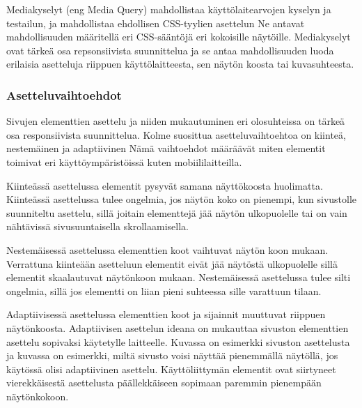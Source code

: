 \documentclass[11pt,a4paper,titlepage,oneside]{article}
\begin{document}
Mediakyselyt (eng Media Query) mahdollistaa käyttölaitearvojen kyselyn ja testailun,
ja mahdollistaa ehdollisen CSS-tyylien asettelun
Ne antavat mahdollisuuden määritellä eri CSS-sääntöjä eri kokoisille näytöille. 
Mediakyselyt ovat tärkeä osa repsonsiivista suunnittelua ja se antaa mahdollisuuden luoda erilaisia asetteluja riippuen käyttölaitteesta,
sen näytön koosta tai kuvasuhteesta.












\subsubsection{Asetteluvaihtoehdot}





Sivujen elementtien asettelu ja niiden mukautuminen eri olosuhteissa on tärkeä osa responsiivista suunnittelua.
Kolme suosittua asetteluvaihtoehtoa on kiinteä, nestemäinen ja adaptiivinen
Nämä vaihtoehdot määräävät miten elementit toimivat eri käyttöympäristöissä kuten mobiililaitteilla.
\medskip



Kiinteässä asettelussa elementit pysyvät samana näyttökoosta huolimatta. 
Kiinteässä asettelussa tulee ongelmia, jos näytön koko on pienempi, kun sivustolle suunniteltu asettelu, 
sillä joitain elementtejä jää näytön ulkopuolelle tai on vain nähtävissä sivusuuntaisella skrollaamisella.
\medskip


Nestemäisessä asettelussa elementtien koot vaihtuvat näytön koon mukaan. 
Verrattuna kiinteään asetteluun elementit eivät jää näytöstä ulkopuolelle sillä elementit skaalautuvat näytönkoon mukaan.
Nestemäisessä asettelussa tulee silti ongelmia, sillä jos elementti on liian pieni suhteessa sille varattuun tilaan.
\medskip


Adaptiivisessä asettelussa elementtien koot ja sijainnit muuttuvat riippuen näytönkoosta.
Adaptiivisen asettelun ideana on mukauttaa sivuston elementtien asettelu sopivaksi käytetylle laitteelle.
Kuvassa \nextImageCount {} on esimerkki sivuston asettelusta ja
kuvassa \nextnextImageCount{} on esimerkki, miltä sivusto voisi näyttää pienemmällä näytöllä, jos käytössä olisi adaptiivinen asettelu.
Käyttöliittymän elementit ovat siirtyneet vierekkäisestä asettelusta päällekkäiseen sopimaan paremmin pienempään näytönkokoon.
\medskip
\end{document}
